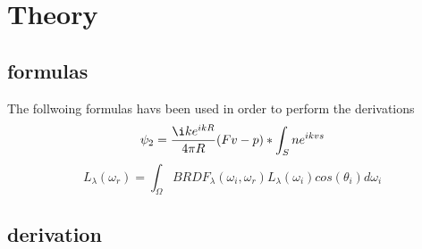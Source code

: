 \documentclass[12pt]{article}
\begin{document}
\section{Theory}
	\subsection{formulas}
	The follwoing formulas havs been used in order to perform the derivations
		\begin{equation} 
			\psi_{2} = \frac{\i k e^{ikR}}{4 \pi R}(Fv - p) * \int_S{ne^{ikvs}}
		\end{equation}
		\begin{equation} 
			L_{\lambda}(\omega_{r}) = \int_{\Omega}{BRDF_{\lambda}(\omega_i, \omega_r) L_{\lambda}(\omega_i)cos(\theta_i) d\omega_i}
		\end{equation}
	\subsection{derivation}
\end{document}
